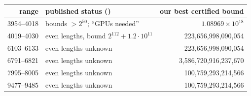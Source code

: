 \begin{tabular}{rlr}
\toprule
range & published status (\cite{frinkle2025}) & our best certified bound \\
\midrule
3954--4018 & bounds $>2^{50}$; ``GPUs needed'' & $1.08969\times 10^{18}$ \\
4019--4030 & even lengths, bound $2^{112}{+}1.2\cdot10^{11}$ & 223{,}656{,}998{,}090{,}054 \\
6103--6133 & even lengths unknown & 223{,}656{,}998{,}090{,}054 \\
6791--6821 & even lengths unknown & 3{,}586{,}720{,}916{,}237{,}670 \\
7995--8005 & even lengths unknown & 100{,}759{,}293{,}214{,}566 \\
9477--9485 & even lengths unknown & 100{,}759{,}293{,}214{,}566 \\
\bottomrule
\end{tabular}
